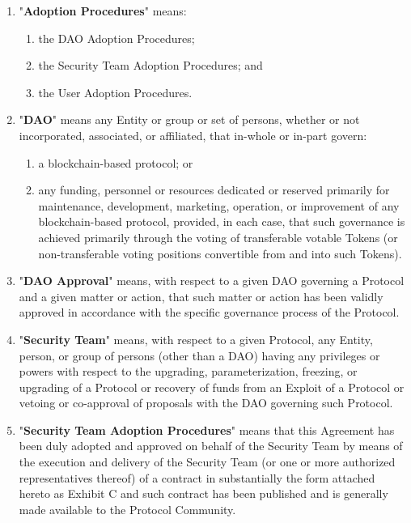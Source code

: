 \documentclass{article}
\begin{document}
\begin{enumerate}
    \item "\textbf{Adoption Procedures}" means:
          \begin{enumerate}
              \item the DAO Adoption Procedures;
              \item the Security Team Adoption Procedures; and
              \item the User Adoption Procedures.
          \end{enumerate}

    \item "\textbf{DAO}" means any Entity or group or set of persons, whether or not incorporated, associated, or affiliated, that in-whole or in-part govern:

          \begin{enumerate}
              \item a blockchain-based protocol; or
              \item any funding, personnel or resources dedicated or reserved primarily for maintenance, development, marketing, operation, or improvement of any blockchain-based protocol, provided, in each case, that such governance is achieved primarily through the voting of transferable votable Tokens (or non-transferable voting positions convertible from and into such Tokens).
          \end{enumerate}

    \item "\textbf{DAO Approval}" means, with respect to a given DAO governing a Protocol and a given matter or action, that such matter or action has been validly approved in accordance with the specific governance process of the Protocol.

    \item "\textbf{Security Team}" means, with respect to a given Protocol, any Entity, person, or group of persons (other than a DAO) having any privileges or powers with respect to the upgrading, parameterization, freezing, or upgrading of a Protocol or recovery of funds from an Exploit of a Protocol or vetoing or co-approval of proposals with the DAO governing such Protocol.

    \item "\textbf{Security Team Adoption Procedures}" means that this Agreement has been duly adopted and approved on behalf of the Security Team by means of the execution and delivery of the Security Team (or one or more authorized representatives thereof) of a contract in substantially the form attached hereto as Exhibit C and such contract has been published and is generally made available to the Protocol Community.


\end{enumerate}
\end{document}

